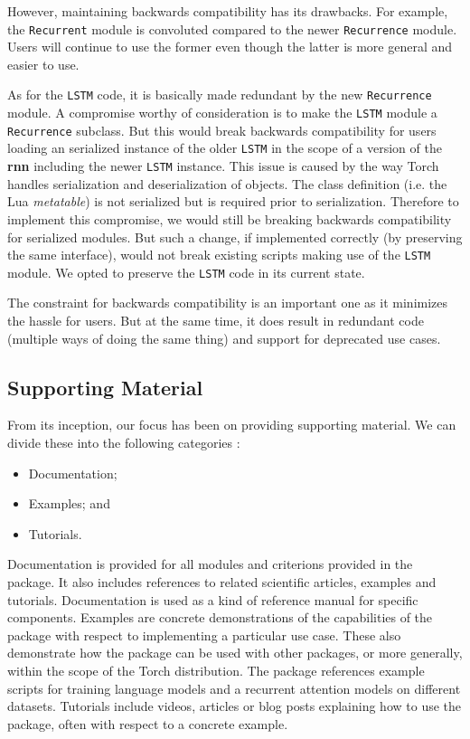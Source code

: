 \documentclass{article} %
\providecommand{\inlinecode}[1]{\texttt{#1}}
\begin{document}
However, maintaining backwards compatibility has its drawbacks.
For example, the \inlinecode{Recurrent} module is convoluted compared to the newer 
\inlinecode{Recurrence} module. Users will continue to use the former even though 
the latter is more general and easier to use. 

As for the \inlinecode{LSTM} code, it is basically made redundant by the new \inlinecode{Recurrence} module.
A compromise worthy of consideration is to make the \inlinecode{LSTM}
module a \inlinecode{Recurrence} subclass. But this would break backwards compatibility
for users loading an serialized instance of the older \inlinecode{LSTM} 
in the scope of a version of the \textbf{rnn} including the newer \inlinecode{LSTM} instance.
This issue is caused by the way Torch handles serialization and deserialization of objects.
The class definition (i.e. the Lua \textit{metatable}) is not serialized but is required prior to 
serialization. Therefore to implement this compromise, we would still be breaking backwards compatibility 
for serialized modules. But such a change, if implemented correctly (by preserving the same interface), 
would not break existing scripts making use of the \inlinecode{LSTM} module. 
We opted to preserve the \inlinecode{LSTM} code in its current state.

The constraint for backwards compatibility is an important one as it minimizes the hassle for users. 
But at the same time, it does result in redundant code (multiple ways of doing the same thing)
and support for deprecated use cases.

\subsection{Supporting Material}

From its inception, our focus has been on providing supporting material.
We can divide these into the following categories :

\begin{itemize}
\item Documentation;
\item Examples; and
\item Tutorials.
\end{itemize}

Documentation is provided for all modules and criterions provided in the package. 
It also includes references to related scientific articles, examples and tutorials.
Documentation is used as a kind of reference manual for specific components.
Examples are concrete demonstrations of the capabilities of the package with respect to 
implementing a particular use case. These also demonstrate how the package can 
be used with other packages, or more generally, within the scope of the Torch distribution.
The package references example scripts for training language models and
a recurrent attention models on different datasets.
Tutorials include videos, articles or blog posts explaining how to use the package, 
often with respect to a concrete example.
\end{document}
